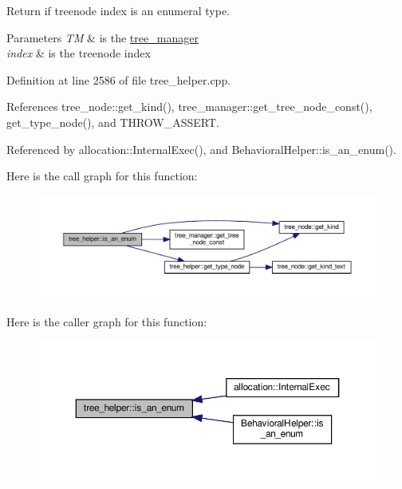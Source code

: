 Return if treenode index is an enumeral type. 


\begin{DoxyParams}{Parameters}
{\em TM} & is the \hyperlink{classtree__manager}{tree\+\_\+manager} \\
\hline
{\em index} & is the treenode index \\
\hline
\end{DoxyParams}


Definition at line 2586 of file tree\+\_\+helper.\+cpp.



References tree\+\_\+node\+::get\+\_\+kind(), tree\+\_\+manager\+::get\+\_\+tree\+\_\+node\+\_\+const(), get\+\_\+type\+\_\+node(), and T\+H\+R\+O\+W\+\_\+\+A\+S\+S\+E\+RT.



Referenced by allocation\+::\+Internal\+Exec(), and Behavioral\+Helper\+::is\+\_\+an\+\_\+enum().

Here is the call graph for this function\+:
\nopagebreak
\begin{figure}[H]
\begin{center}
\leavevmode
\includegraphics[width=350pt]{d7/d99/classtree__helper_ad18a626687479193e34f341bf2cc131e_cgraph}
\end{center}
\end{figure}
Here is the caller graph for this function\+:
\nopagebreak
\begin{figure}[H]
\begin{center}
\leavevmode
\includegraphics[width=350pt]{d7/d99/classtree__helper_ad18a626687479193e34f341bf2cc131e_icgraph}
\end{center}
\end{figure}
\mbox{\label{classtree__helper_abc58540390ce3475eb640025e1e6ea61}} 
